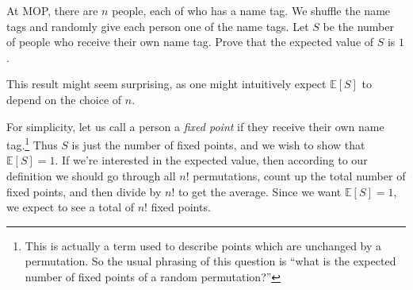 \documentclass[11pt]{scrartcl}
\newcommand\EE{\mathbb E}
\begin{document}
\begin{example}
  At MOP, there are $n$ people, each of who has a name tag.
  We shuffle the name tags and randomly give each person one of the name tags.
  Let $S$ be the number of people who receive their own name tag.
  Prove that the expected value of $S$ is $1$.
\end{example}

This result might seem surprising, as one might intuitively expect $\EE[S]$ to depend on the choice of $n$.

For simplicity, let us call a person a \emph{fixed point} if they receive their own name tag.\footnote{This is actually a term used to describe points which are unchanged by a permutation. So the usual phrasing of this question is ``what is the expected number of fixed points of a random permutation?''}
Thus $S$ is just the number of fixed points, and we wish to show that $\EE[S]=1$.
If we're interested in the expected value, then according to our definition we should go through all $n!$ permutations, count up the total number of fixed points, and then divide by $n!$ to get the average.
Since we want $\EE[S] = 1$, we expect to see a total of $n!$ fixed points.
\end{document}
